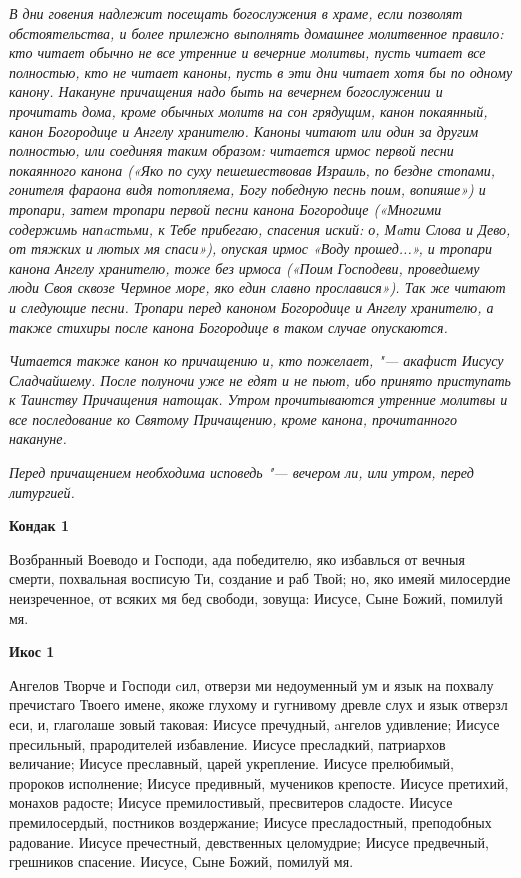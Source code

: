 \itshape В дни говения надлежит посещать богослужения в храме, если позволят обстоятельства, и более прилежно выполнять домашнее молитвенное правило: кто читает обычно не все утренние и вечерние молитвы, пусть читает все полностью, кто не читает каноны, пусть в эти дни читает хотя бы по одному канону. Накануне причащения надо быть на вечернем богослужении и прочитать дома, кроме обычных молитв на сон грядущим, канон покаянный, канон Богородице и Ангелу хранителю. Каноны читают или один за другим полностью, или соединяя таким образом: читается ирмос первой песни покаянного канона («Яко по суху пешешествовав Израиль, по бездне стопами, гонителя фараона видя потопляема, Богу победную песнь поим, вопияше») и тропари, затем тропари первой песни канона Богородице («Многими содержимь напaстьми, к Тебе прибегаю, спасения иский: о, Мaти Слова и Дево, от тяжких и лютых мя спаси»), опуская ирмос «Воду прошед...», и тропари канона Ангелу хранителю, тоже без ирмоса («Поим Господеви, проведшему люди Своя сквозе Чермное море, яко един славно прославися»). Так же читают и следующие песни. Тропари перед каноном Богородице и Ангелу хранителю, а также стихиры после канона Богородице в таком случае опускаются.\normalfont{}


\itshape Читается также канон ко причащению и, кто пожелает, "--- акафист Иисусу Сладчайшему. После полуночи уже не едят и не пьют, ибо принято приступать к Таинству Причащения натощак. Утром прочитываются утренние молитвы и все последование ко Святому Причащению, кроме канона, прочитанного накануне.\normalfont{}


\itshape Перед причащением необходима исповедь "--- вечером ли, или утром, перед литургией.\normalfont{}


\mychapterending

 
\bfseries Кондак 1\normalfont{}


Возбранный  Воеводо и Господи, ада победителю, яко избавлься от вечныя смерти, похвальная восписую Ти, создание и раб Твой; но, яко имеяй милосердие неизреченное, от всяких мя бед свободи, зовуща: Иисусе, Сыне Божий, помилуй мя.


\medskip
\bfseries Икос 1\normalfont{}


Ангелов
Творче и Господи cил, отверзи ми недоуменный ум и язык на похвалу пречистаго Твоего имене, якоже глухому и гугнивому древле слух и язык отверзл еси, и, глаголаше зовый таковая: Иисусе пречудный, aнгелов удивление; Иисусе пресильный, прародителей избавление. Иисусе пресладкий, патриархов величание; Иисусе преславный, царей укрепление. Иисусе прелюбимый, пророков исполнение; Иисусе предивный, мучеников крепосте. Иисусе претихий, монахов радосте; Иисусе премилостивый,
пресвитеров сладосте. Иисусе премилосердый, постников воздержание; Иисусе пресладостный, преподобных радование. Иисусе пречестный, девственных целомудрие; Иисусе предвечный, грешников спасение. Иисусе, Сыне Божий, помилуй мя.


